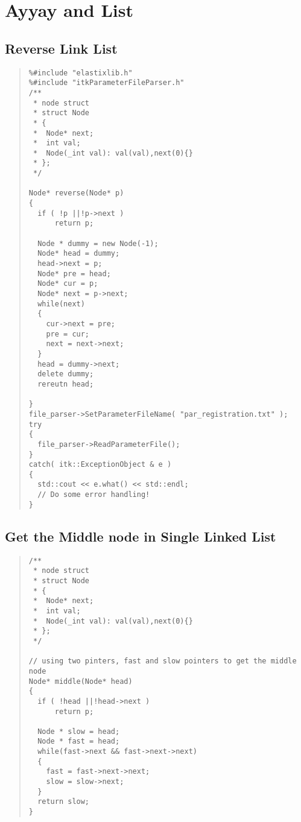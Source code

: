 \chapter{Ayyay and List}\label{chp:ArrayList}

\section{Reverse Link List}

\begin{quote}
\begin{verbatim}
%#include "elastixlib.h"
%#include "itkParameterFileParser.h"
/**
 * node struct
 * struct Node
 * {
 *  Node* next;
 *  int val;
 *  Node(_int val): val(val),next(0){}
 * };
 */

Node* reverse(Node* p)
{
  if ( !p ||!p->next )
      return p;
  
  Node * dummy = new Node(-1);
  Node* head = dummy;
  head->next = p;
  Node* pre = head;
  Node* cur = p;
  Node* next = p->next;
  while(next)
  {
    cur->next = pre;
    pre = cur;
    next = next->next;
  }
  head = dummy->next;
  delete dummy;
  rereutn head;

}
file_parser->SetParameterFileName( "par_registration.txt" );
try
{
  file_parser->ReadParameterFile();
}
catch( itk::ExceptionObject & e )
{
  std::cout << e.what() << std::endl;
  // Do some error handling!
}

\end{verbatim}
\end{quote}



\section{Get the Middle node in Single Linked List}

\begin{quote}
\begin{verbatim}
/**
 * node struct
 * struct Node
 * {
 *  Node* next;
 *  int val;
 *  Node(_int val): val(val),next(0){}
 * };
 */

// using two pinters, fast and slow pointers to get the middle node
Node* middle(Node* head)
{
  if ( !head ||!head->next )
      return p;
  
  Node * slow = head;
  Node * fast = head;
  while(fast->next && fast->next->next)
  {
    fast = fast->next->next;
    slow = slow->next;  
  }
  return slow;
}

\end{verbatim}
\end{quote}




